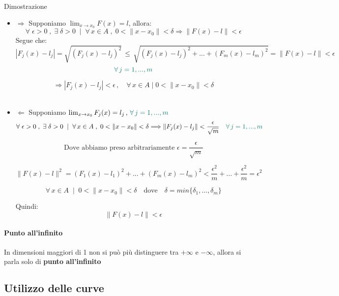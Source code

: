 \documentclass[x11names]{article}
\begin{document}
	\begin{es}{Dimostrazione} 
		\begin{itemize}
			\item $\Longrightarrow$ Supponiamo $\lim_{x \to x_0} F(x) = l$, allora: 
			\[
			\forall\; \epsilon > 0\;,\; \exists\; \delta > 0\;\;|\;\;\forall\,x \in A\;,\; 0 < \|x-x_0\| < \delta \Longrightarrow \|F(x)-l\|<\epsilon
			\]
			Segue che: 
			\[
			\left|F_j(x)-l_j\right|=\sqrt{\left(F_j(x)-l_j\right)^2}\,\leq\,\sqrt{\left(F_j(x)-l_j\right)^2+...+\left(F_m(x)-l_m\right)^2} = \|F(x)-l\|<\epsilon
			\]
			\[
			\centering{\color{CadmiumGreen} \forall\,j=1,...,m}
			\]
			
			\[
			\Longrightarrow \left|F_j(x)-l_j\right| < \epsilon\,,\quad\forall\,x\in A\; |\; 0 < \|x-x_0\| < \delta 
			\] \\
			\item $\Longleftarrow$ Supponiamo $\lim_{x \to x_0} F_j(x) = l_j\,,\,{\color{CadmiumGreen}\forall \,j=1,...,m}$
			\[ 
			\forall\; \epsilon > 0\;,\; \exists\; \delta > 0\;\;|\;\;\forall\,x \in A\;,\; 0 < \|x-x_0\| < \delta \Longrightarrow \|F_j(x)-l_j\|<\frac{\epsilon}{\sqrt{m}} \quad {\color{CadmiumGreen} \forall \,j=1,...,m}
			\]
			
			\[\text{Dove abbiamo preso arbitrariamente  } \epsilon = \frac{\epsilon}{\sqrt{m}} \]
			
			\[
			\|F(x)-l\|^2 = \left(F_1(x)-l_1\right)^2+...+\left(F_m(x)-l_m\right)^2 < \frac{\epsilon^2}{m} + ... + \frac{\epsilon^2}{m} = \epsilon^2
			\]
			
			\[
			\forall\,x\in A\;\; |\;\; 0 < \|x-x_0\| < \delta \quad\text{dove}\quad\delta = min\{\delta_1,...,\delta_m\}
			\]
			
			Quindi: 
			\[
			\|F(x)-l\| < \epsilon
			\]
			
		\end{itemize}
	\end{es}
	
	\paragraph{Punto all'infinito}
	In dimensioni maggiori di 1 non si può più distinguere tra \(+\infty\) e \(-\infty\), allora si parla solo di \textbf{punto all'infinito}
	
	\subsection{Utilizzo delle curve}
	
\end{document}
